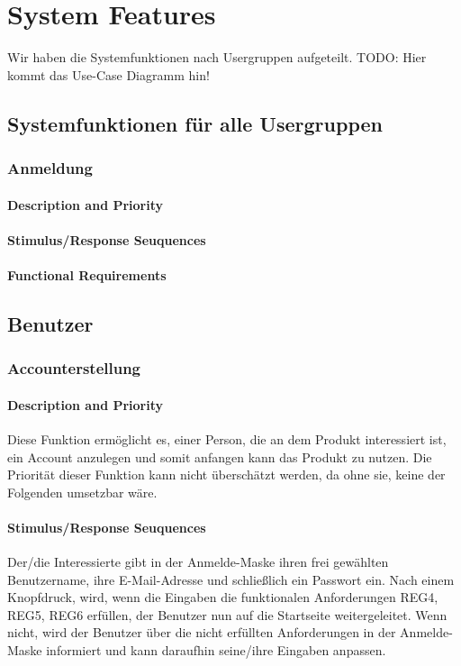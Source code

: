 \section{System Features}
Wir haben die Systemfunktionen nach Usergruppen aufgeteilt. TODO: Hier kommt das Use-Case Diagramm hin!

\subsection{Systemfunktionen für alle Usergruppen}
\subsubsection{Anmeldung}
\paragraph{Description and Priority}
\paragraph{Stimulus/Response Seuquences}
\paragraph{Functional Requirements}

\subsection{Benutzer}
\subsubsection{Accounterstellung}
\paragraph{Description and Priority}
Diese Funktion ermöglicht es, einer Person, die an dem Produkt interessiert ist, ein Account anzulegen und somit anfangen kann das Produkt zu nutzen. Die Priorität dieser Funktion kann nicht überschätzt werden, da ohne sie, keine der Folgenden umsetzbar wäre.
\paragraph{Stimulus/Response Seuquences} Der/die Interessierte gibt in der Anmelde-Maske ihren frei gewählten Benutzername, ihre E-Mail-Adresse und schließlich ein Passwort ein. Nach einem Knopfdruck, wird, wenn die Eingaben die funktionalen Anforderungen REG4, REG5, REG6 erfüllen, der Benutzer nun auf die Startseite weitergeleitet. Wenn nicht, wird der Benutzer über die nicht erfüllten Anforderungen in der Anmelde-Maske informiert und kann daraufhin seine/ihre Eingaben anpassen.
